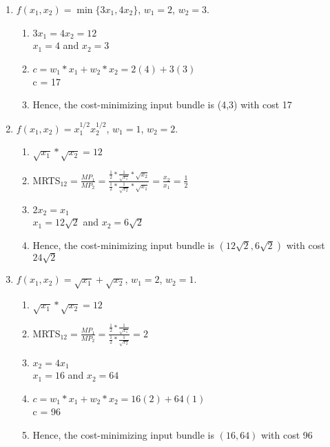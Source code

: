 \documentclass[11pt]{article}
\begin{document}
\begin{enumerate}
\begin{enumerate}
        \item $f(x_{1},x_{2})=\min\{3x_{1},4x_{2}\}$, $w_{1}=2$, $w_{2}=3$.
        \begin{enumerate}
            \item $3x_1 = 4x_2 = 12$\\
            $x_1 = 4$ and $x_2 = 3$
            \item $c = w_1 * x_1 + w_2*x_2 = 2(4) + 3(3)$\\
            c = 17
            \item Hence, the cost-minimizing input bundle is (4,3) with cost 17
        \end{enumerate}

        \item $f(x_{1},x_{2})=x_{1}^{1/2}x_{2}^{1/2}$, $w_{1}=1$, $w_{2}=2$.
        \begin{enumerate}
            \item $\sqrt{x_1}*\sqrt{x_2} = 12$
            \item MRTS$_{12} = \frac{MP_1}{MP_2} = \frac{\frac{1}{2}*\frac{1}{\sqrt{x_1}}*\sqrt{x_2}}{\frac{1}{2}*\frac{1}{\sqrt{x_2}}*\sqrt{x_1}} = \frac{x_2}{x_1} = \frac{1}{2}$
            \item $2x_2 = x_1$\\
            $x_1 = 12\sqrt{2}$ and  $x_2 = 6\sqrt{2}$
            \item Hence, the cost-minimizing input bundle is $(12\sqrt{2},6\sqrt{2})$ with cost $24\sqrt{2}$
        \end{enumerate}

        \item $f(x_{1},x_{2})=\sqrt{x_{1}}+\sqrt{x_{2}}$, $w_{1}=2$, $w_{2}=1$.
        \begin{enumerate}
            \item $\sqrt{x_1}*\sqrt{x_2} = 12$
            \item MRTS$_{12} = \frac{MP_1}{MP_2} = \frac{\frac{1}{2}*\frac{1}{\sqrt{x_1}}}{\frac{1}{2}*\frac{1}{\sqrt{x_2}}} = 2$
            \item $x_2 = 4x_1$\\
            $x_1 = 16$ and  $x_2 = 64$
            \item $c = w_1 * x_1 + w_2*x_2 = 16(2) + 64(1)$\\
            c = 96
            \item Hence, the cost-minimizing input bundle is $(16, 64)$ with cost 96
            
        \end{enumerate}
    \end{enumerate}


\end{enumerate}
\end{document}
